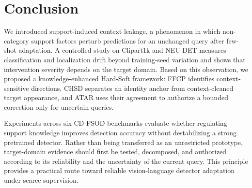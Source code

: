 \section{Conclusion}
\label{sec:conclusion}

We introduced support-induced context leakage, a phenomenon in which non-category support factors perturb predictions for an unchanged query after few-shot adaptation. A controlled study on Clipart1k and NEU-DET measures classification and localization drift beyond training-seed variation and shows that intervention severity depends on the target domain. Based on this observation, we proposed a knowledge-enhanced Hard-Soft framework: FFCP identifies context-sensitive directions, CHSD separates an identity anchor from context-cleaned target appearance, and ATAR uses their agreement to authorize a bounded correction only for uncertain queries.

Experiments across six CD-FSOD benchmarks evaluate whether regulating support knowledge improves detection accuracy without destabilizing a strong pretrained detector. Rather than being transferred as an unrestricted prototype, target-domain evidence should first be tested, decomposed, and authorized according to its reliability and the uncertainty of the current query. This principle provides a practical route toward reliable vision-language detector adaptation under scarce supervision.
